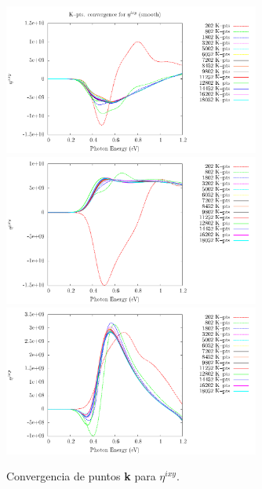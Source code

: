 \documentclass[11pt]{article}
\begin{document}
\begin{figure}
	\begin{center}
		\includegraphics[width=0.75\textwidth]{./figures/up/res3_eta_1_sm.pdf}\\
		\includegraphics[width=0.75\textwidth]{./figures/up/res3_eta_2_sm.pdf}\\
		\includegraphics[width=0.75\textwidth]{./figures/up/res3_eta_3_sm.pdf}
	\end{center}
	\caption{Convergencia de puntos \textbf{k} para $\eta^{ixy}$.}
	\label{fig:eta_up}
\end{figure}
\end{document}
